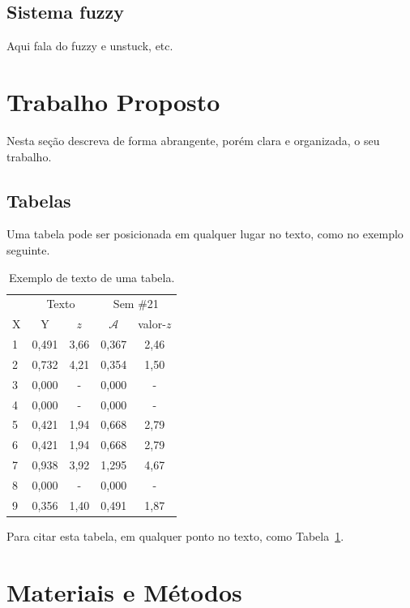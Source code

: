 \documentclass[twoside,conference,a4paper]{IEEEtran}
\begin{document}
\subsection{Sistema fuzzy}

Aqui fala do fuzzy e unstuck, etc.

\section{Trabalho Proposto}

Nesta seção descreva de forma abrangente, porém clara e organizada, o seu trabalho.

\subsection{Tabelas}

Uma tabela pode ser posicionada em qualquer lugar no texto, como no exemplo
seguinte.
%
\begin{table}[ht]
\renewcommand{\arraystretch}{1.3}
\centering
 \caption{Exemplo de texto de uma tabela.}
 \label{tab:tab1}
 \begin{tabular}{lcccc}\hline
  & \multicolumn{2}{c}{Texto}
  & \multicolumn{2}{c}{Sem \#21} \\ \cline{2-5}
  X & Y & $z$ & $\mathcal{A}$ & valor-$z$ \\ \hline \hline
  1      &0,491  & 3,66   &0,367 &2,46  \\
  2    &0,732  & 4,21   &0,354 &1,50  \\
  3      &0,000  & -      &0,000 & -    \\
  4      &0,000  & -      &0,000 & -  \\
  5      &0,421  & 1,94   &0,668 &2,79  \\
  6      &0,421  & 1,94   &0,668 &2,79  \\
  7      &0,938  & 3,92   &1,295 &4,67 \\
  8       &0,000  & -      &0,000 & - \\
  9       &0,356  & 1,40   &0,491 &1,87 \\ \hline
 \end{tabular}
\end{table}

Para citar esta tabela, em qualquer ponto no texto, como Tabela~\ref{tab:tab1}.


\section{Materiais e Métodos}
\end{document}
